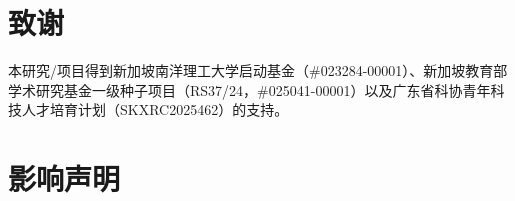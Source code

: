 \documentclass{article}
\theoremstyle{plain}
\theoremstyle{definition}
\theoremstyle{remark}
\begin{document}

\begin{abstract}


对于需要跨越单个上下文窗口运行的大语言模型（LLM）智能体，记忆正变得愈发重要。然而，现有系统大多依赖离线、查询无关的记忆构建，这种方式不仅效率不高，还可能丢弃对当前查询至关重要的信息。运行时利用记忆虽然是一种自然的替代方案，但既有工作往往会引入可观的额外开销，并且难以显式控制性能与成本之间的权衡。
本文提出 \textbf{BudgetMem}，一种面向运行时智能体记忆的框架，用于实现显式、查询感知的性能--成本控制。
BudgetMem 将记忆处理组织为一组记忆模块，每个模块均提供三个预算档位，即 \textsc{低}/\textsc{中}/\textsc{高}。轻量级路由器在各模块间执行预算档位路由，以平衡任务性能与记忆构建成本；该路由器由一个通过强化学习训练的紧凑神经策略实现。
以 BudgetMem 为统一试验平台，我们研究了实现预算档位的三种互补策略：实现分层（方法复杂度）、推理分层（推理行为）和容量分层（模块模型规模）。
在 LoCoMo、LongMemEval 和 HotpotQA 上，当系统优先追求性能（即高预算设置）时，BudgetMem 超越了强基线；在预算更紧张时，它也能取得更优的准确率--成本前沿。
此外，我们的分析厘清了不同分层策略各自的优势与局限，说明在不同预算区间内，哪一种维度能够带来最有利的权衡。
代码已发布于 \href{https://github.com/ViktorAxelsen/BudgetMem}{https://github.com/ViktorAxelsen/BudgetMem}。




\end{abstract}











\section*{致谢}
本研究/项目得到新加坡南洋理工大学启动基金（\#023284-00001）、新加坡教育部学术研究基金一级种子项目（RS37/24，\#025041-00001）以及广东省科协青年科技人才培育计划（SKXRC2025462）的支持。





\section*{影响声明}
\end{document}
